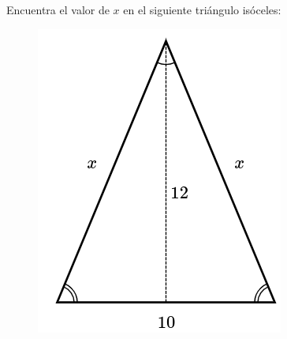 Encuentra el valor de $x$ en el siguiente triángulo isóceles:

\begin{figure}[H]
    \centering
    \includegraphics[width=0.25\linewidth]{../images/pitagoras11.png}
    \caption{}
    \label{fig:pitagoras11}
\end{figure}

